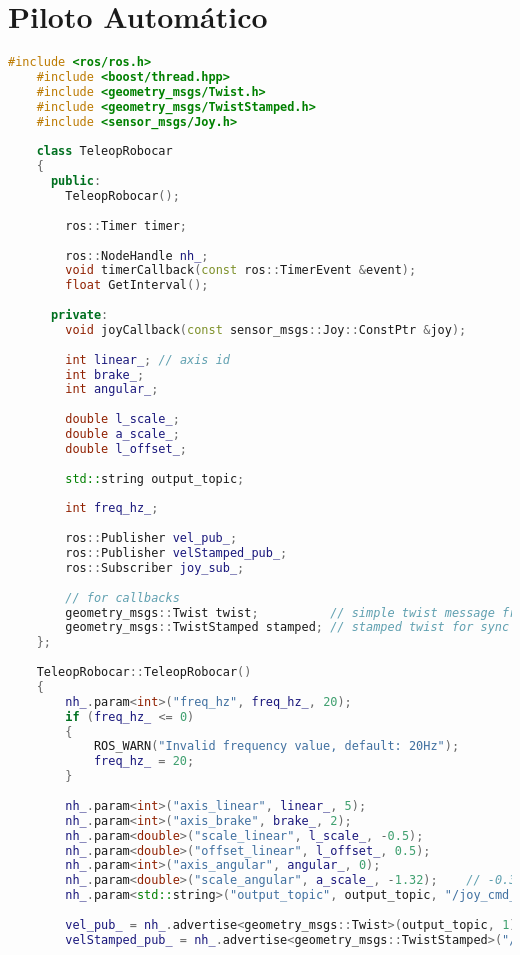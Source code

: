 \section{Piloto Automático}

\begin{lstlisting}[title={joy\_teleop.cpp},language=c++]
    #include <ros/ros.h>
    #include <boost/thread.hpp>
    #include <geometry_msgs/Twist.h>
    #include <geometry_msgs/TwistStamped.h>
    #include <sensor_msgs/Joy.h>
    
    class TeleopRobocar
    {
      public:
        TeleopRobocar();
    
        ros::Timer timer;
    
        ros::NodeHandle nh_;
        void timerCallback(const ros::TimerEvent &event);
        float GetInterval();
    
      private:
        void joyCallback(const sensor_msgs::Joy::ConstPtr &joy);
    
        int linear_; // axis id
        int brake_;
        int angular_;
    
        double l_scale_;
        double a_scale_;
        double l_offset_;
    
        std::string output_topic;
    
        int freq_hz_;
    
        ros::Publisher vel_pub_;
        ros::Publisher velStamped_pub_;
        ros::Subscriber joy_sub_;
    
        // for callbacks
        geometry_msgs::Twist twist;          // simple twist message from joystick
        geometry_msgs::TwistStamped stamped; // stamped twist for sync
    };
    
    TeleopRobocar::TeleopRobocar()
    {
        nh_.param<int>("freq_hz", freq_hz_, 20);
        if (freq_hz_ <= 0)
        {
            ROS_WARN("Invalid frequency value, default: 20Hz");
            freq_hz_ = 20;
        }
    
        nh_.param<int>("axis_linear", linear_, 5);
        nh_.param<int>("axis_brake", brake_, 2);
        nh_.param<double>("scale_linear", l_scale_, -0.5);
        nh_.param<double>("offset_linear", l_offset_, 0.5);
        nh_.param<int>("axis_angular", angular_, 0);
        nh_.param<double>("scale_angular", a_scale_, -1.32);    // -0.34
        nh_.param<std::string>("output_topic", output_topic, "/joy_cmd_vel");
    
        vel_pub_ = nh_.advertise<geometry_msgs::Twist>(output_topic, 1);
        velStamped_pub_ = nh_.advertise<geometry_msgs::TwistStamped>("/stamped_cmd_vel", 1);
    

\end{lstlisting}
